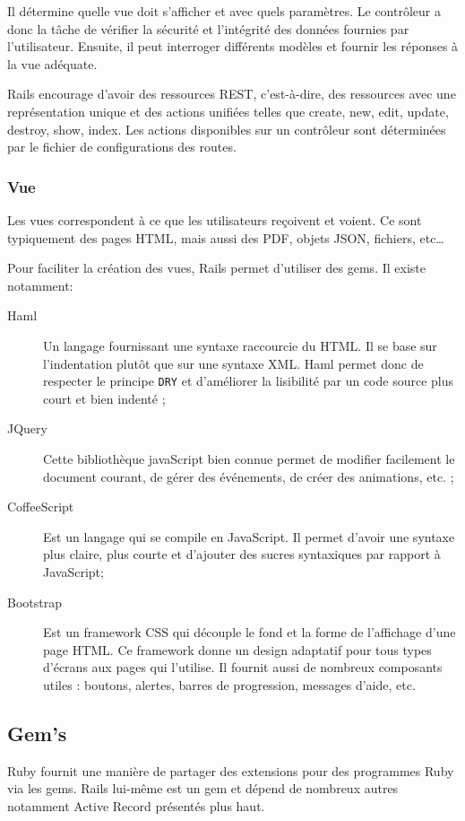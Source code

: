 Il détermine quelle vue doit s'afficher et avec quels paramètres. Le contrôleur a donc la tâche de vérifier la sécurité et l'intégrité des données fournies par l'utilisateur. Ensuite, il peut interroger différents modèles et fournir les réponses à la vue adéquate.

Rails encourage d'avoir des ressources REST, c'est-à-dire, des ressources avec une représentation unique et des actions unifiées telles que create, new, edit, update, destroy, show, index. Les actions disponibles sur un contrôleur sont déterminées par le fichier de configurations des routes.

\subsubsection{Vue} 
Les vues correspondent à ce que les utilisateurs reçoivent et voient. Ce sont typiquement des pages HTML, mais aussi des PDF, objets JSON, fichiers, etc\ldots

Pour faciliter la création des vues, Rails permet d'utiliser des gems. Il existe notamment: 
\begin{description}
  \item[Haml] Un langage fournissant une syntaxe raccourcie du HTML. Il se base sur l'indentation plutôt que sur une syntaxe XML. Haml permet donc de respecter le principe \texttt{DRY} et d'améliorer la lisibilité par un code source plus court et bien indenté ; \label{haml}
  \item[JQuery] Cette bibliothèque javaScript bien connue permet de modifier facilement le document courant, de gérer des événements, de créer des animations, etc. ;
  \item[CoffeeScript] Est un langage qui se compile en JavaScript. Il permet d'avoir une syntaxe plus claire, plus courte et d'ajouter des sucres syntaxiques par rapport à JavaScript;
  \item[Bootstrap] Est un framework CSS qui découple le fond et la forme de l'affichage d'une page HTML. Ce framework donne un design adaptatif pour tous types d'écrans aux pages qui l'utilise. Il fournit aussi de nombreux composants utiles : boutons, alertes, barres de progression, messages d'aide, etc. \label{bootstrap}
\end{description}
\subsection{Gem's}
Ruby fournit une manière de partager des extensions pour des programmes Ruby via les gems. Rails lui-même est un gem et dépend de nombreux autres notamment Active Record présentés plus haut.

